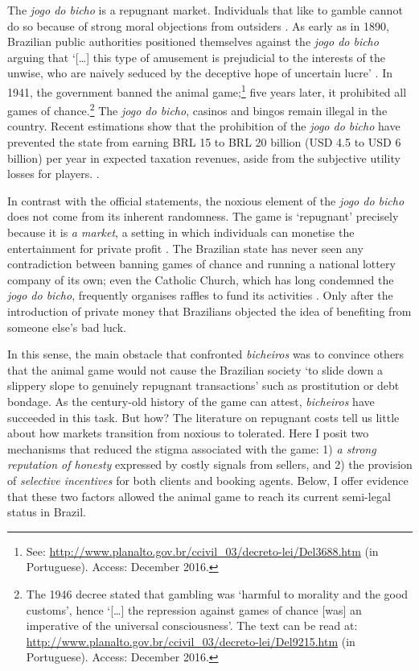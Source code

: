 The \emph{jogo do bicho} is a repugnant market. Individuals that like to gamble cannot do so because of strong moral objections from outsiders \citep{brisset2016marche, roth2007repugnance, satz2010some, zelizer1979morals}. As early as in 1890, Brazilian public authorities positioned themselves against the \emph{jogo do bicho} arguing that `{[}\ldots{}{]} this type of amusement is prejudicial to the interests of the unwise, who are naively seduced by the deceptive hope of uncertain lucre' \citep[544]{chazkel2007beyond}. In 1941, the government banned the animal game;\footnote{See: \url{http://www.planalto.gov.br/ccivil_03/decreto-lei/Del3688.htm} (in Portuguese). Access: December 2016.} five years later, it prohibited all games of chance.\footnote{The 1946 decree stated that gambling was `harmful to morality and the good customs', hence `[\dots] the repression against games of chance [was] an imperative of the universal consciousness'. The text can be read at: \url{http://www.planalto.gov.br/ccivil_03/decreto-lei/Del9215.htm} (in Portuguese). Access: December 2016.} The \emph{jogo do bicho}, casinos and bingos remain illegal in the country. Recent estimations show that the prohibition of the \emph{jogo do bicho} have prevented the state from earning BRL 15 to BRL 20 billion (USD 4.5 to USD 6 billion) per year in expected taxation revenues, aside from the subjective utility losses for players. \citep{congressoemfoco2015bicho, fsp2016legalizarbicho}.

In contrast with the official statements, the noxious element of the \emph{jogo do bicho} does not come from its inherent randomness. The game is `repugnant' precisely because it is \emph{a market}, a setting in which individuals can monetise the entertainment for private profit \citep{chazkel2007beyond, chazkel2011laws}. The Brazilian state has never seen any contradiction between banning games of chance and running a national lottery company of its own; even the Catholic Church, which has long condemned the \emph{jogo do bicho}, frequently organises raffles to fund its activities \citep[49]{abreu1996imperio, magalhaes2005ganhou}. Only after the introduction of private money that Brazilians objected the idea of benefiting from someone else's bad luck.

In this sense, the main obstacle that confronted \emph{bicheiros} was to convince others that the animal game would not cause the Brazilian society `to slide down a slippery slope to genuinely repugnant transactions' \citep[45]{roth2007repugnance} such as prostitution or debt bondage. As the century-old history of the game can attest, \emph{bicheiros} have succeeded in this task. But how? The literature on repugnant costs tell us little about how markets transition from noxious to tolerated. Here I posit two mechanisms that reduced the stigma associated with the game: 1) \emph{a strong reputation of honesty} expressed by costly signals from sellers, and 2) the provision of \emph{selective incentives} for both clients and booking agents. Below, I offer evidence that these two factors allowed the animal game to reach its current semi-legal status in Brazil.

